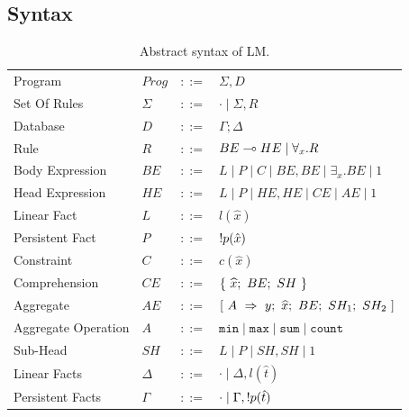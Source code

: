 \subsection{Syntax}

\renewcommand{\arraystretch}{1.2}
\begin{table}[h]
\centering
{\scriptsize
\begin{tabular}{ l l c l }
  Program & $Prog$ & $::=$ & $\Sigma, D$ \\
  Set Of Rules & $\Sigma$ & $::=$ & $\cdot \; | \; \Sigma, R$\\
  Database & $D$ & $::=$ & $\Gamma; \Delta$ \\
  Rule & $R$ & $::=$ & $BE \multimap HE \; | \; \forall_{x}. R$ \\
  Body Expression & $BE$ & $::=$ & $L \; | \; P \; | \; C \; | \; BE, BE \; | \; \exists_{x}. BE \; | \; 1$\\
  Head Expression & $HE$ & $::=$ & $L \; | \; P \; | \; HE, HE \; | \; CE \; | \; AE \; | \; 1$\\
  
  Linear Fact & $L$ & $::=$ & $l(\hat{x})$\\
  Persistent Fact & $P$ & $::=$ & ${!} p(\hat{x})$\\
  Constraint & $C$ & $::=$ & $c(\hat{x})$ \\
  
  Comprehension & $CE$ & $::=$ & $\{~\widehat{x};~BE;~SH~\}$ \\
  Aggregate & $AE$ & $::=$ & $[~A~\Rightarrow~y;~\widehat{x};~BE;~SH_1;~SH_2~]$ \\
  Aggregate Operation & $A$ & $::=$ & $\mathtt{min} \; | \; \mathtt{max} \; | \; \mathtt{sum} \; | \; \mathtt{count}$ \\
  
  Sub-Head & $SH$ & $::=$ & $L \; | \; P \; | \; SH, SH \; | \; 1$\\
  
  Linear Facts & $\Delta$ & $::=$ & $\cdot \; | \; \Delta, l(\hat{t})$ \\
  Persistent Facts & $\Gamma$ & $::=$ & $\cdot \; | \; \Gamma, {!} p(\hat{t})$ \\
\end{tabular}
}
\caption{Abstract syntax of LM.}
\label{tbl:ast}
\end{table}
\renewcommand{\arraystretch}{1.0}

